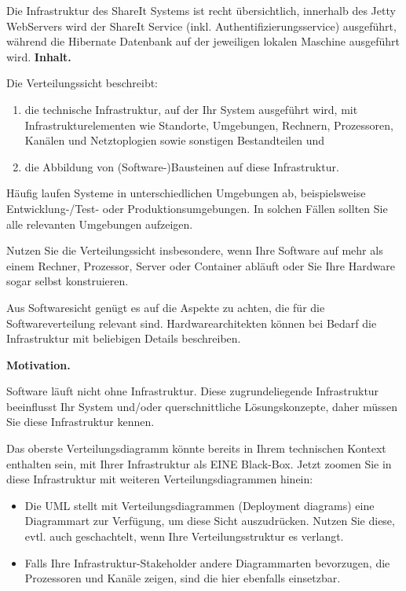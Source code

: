 \documentclass[]{article}
\begin{document}
Die Infrastruktur des ShareIt Systems ist recht übersichtlich, innerhalb des Jetty WebServers wird der ShareIt Service (inkl. Authentifizierungsservice) ausgeführt, während die Hibernate Datenbank auf der jeweiligen lokalen Maschine ausgeführt wird.
\textbf{Inhalt.}

Die Verteilungssicht beschreibt:

\begin{enumerate}
\def\labelenumi{\arabic{enumi}.}
\item
  die technische Infrastruktur, auf der Ihr System ausgeführt wird, mit
  Infrastrukturelementen wie Standorte, Umgebungen, Rechnern,
  Prozessoren, Kanälen und Netztoplogien sowie sonstigen Bestandteilen
  und
\item
  die Abbildung von (Software-)Bausteinen auf diese Infrastruktur.
\end{enumerate}

Häufig laufen Systeme in unterschiedlichen Umgebungen ab, beispielsweise
Entwicklung-/Test- oder Produktionsumgebungen. In solchen Fällen sollten
Sie alle relevanten Umgebungen aufzeigen.

Nutzen Sie die Verteilungssicht insbesondere, wenn Ihre Software auf
mehr als einem Rechner, Prozessor, Server oder Container abläuft oder
Sie Ihre Hardware sogar selbst konstruieren.

Aus Softwaresicht genügt es auf die Aspekte zu achten, die für die
Softwareverteilung relevant sind. Hardwarearchitekten können bei Bedarf
die Infrastruktur mit beliebigen Details beschreiben.

\textbf{Motivation.}

Software läuft nicht ohne Infrastruktur. Diese zugrundeliegende
Infrastruktur beeinflusst Ihr System und/oder querschnittliche
Lösungskonzepte, daher müssen Sie diese Infrastruktur kennen.

Das oberste Verteilungsdiagramm könnte bereits in Ihrem technischen
Kontext enthalten sein, mit Ihrer Infrastruktur als EINE Black-Box.
Jetzt zoomen Sie in diese Infrastruktur mit weiteren
Verteilungsdiagrammen hinein:

\begin{itemize}
\item
  Die UML stellt mit Verteilungsdiagrammen (Deployment diagrams) eine
  Diagrammart zur Verfügung, um diese Sicht auszudrücken. Nutzen Sie
  diese, evtl. auch geschachtelt, wenn Ihre Verteilungsstruktur es
  verlangt.
\item
  Falls Ihre Infrastruktur-Stakeholder andere Diagrammarten bevorzugen,
  die Prozessoren und Kanäle zeigen, sind die hier ebenfalls einsetzbar.
\end{itemize}
\end{document}
